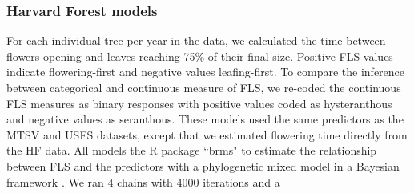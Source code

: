 \documentclass{article}\usepackage[]{graphicx}\usepackage[]{color}
\begin{document}
\subsubsection*{Harvard Forest models}
For each individual tree per year in the data, we calculated the time between flowers opening and leaves reaching 75\% of their final size. Positive FLS values indicate flowering-first and negative values leafing-first. To compare the inference between categorical and continuous measure of FLS, we re-coded the continuous FLS measures as binary responses with positive values coded as hysteranthous and negative values as seranthous. These models used the same predictors as the MTSV and USFS datasets, except that we estimated flowering time directly from the HF data. All models the R package ``brms" \citep{Burkner2018} to estimate the relationship between FLS and the predictors with a phylogenetic mixed model in a Bayesian framework \citep{Garamszegi2014}. We ran 4 chains with 4000 iterations and a
\end{document}
